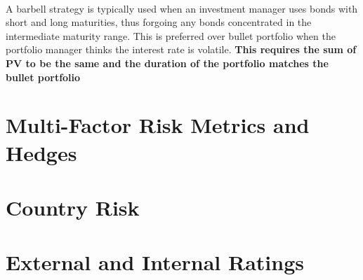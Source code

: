 \documentclass[11pt,fleqn]{book} %
\numberwithin{equation}{section} %
\numberwithin{figure}{section} %
\numberwithin{table}{section} %
\begin{document}
\begin{definition}\textbf{}\\
    A barbell strategy is typically used when an investment manager uses bonds with short and
    long maturities, thus forgoing any bonds concentrated in the intermediate maturity
    range. This is preferred over bullet portfolio when the portfolio manager thinks
    the interest rate is volatile. \textbf{This requires the sum of PV to be the same
    and the duration of the portfolio matches the bullet portfolio}
\end{definition}
\chapter{Multi-Factor Risk Metrics and Hedges}

\chapter{Country Risk}

\chapter{External and Internal Ratings}

\end{document}
